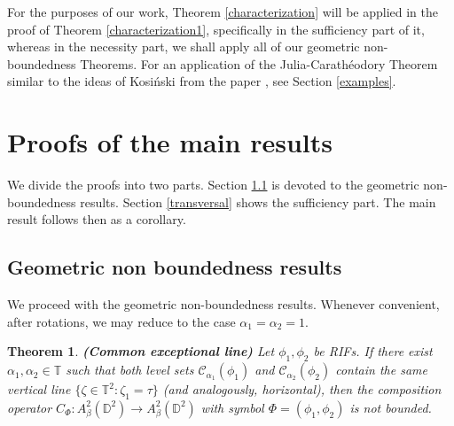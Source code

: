 \documentclass[12pt]{amsart}
\newtheorem{theorem}{Theorem}[section]
\numberwithin{equation}{section}
\begin{document}
For the purposes of our work, Theorem \ref{characterization} will be applied in the proof of Theorem \ref{characterization1}, specifically in the sufficiency part of it, whereas in the necessity part, we shall apply all of our geometric non-boundedness Theorems. For an application of the Julia-Carath\'eodory Theorem similar to the ideas of Kosi\'nski from the paper \cite{CompositionsKosinski}, see Section \ref{examples}.
\section{Proofs of the main results} \label{proofs} We divide the proofs into two parts. Section \ref{geometric} is devoted to the geometric non-boundedness results. Section \ref{transversal} shows the sufficiency part. The main result follows then as a corollary.
\subsection{Geometric non boundedness results}\label{geometric} We proceed with the geometric non-boundedness results.
Whenever convenient, after rotations, we may reduce to the case $\alpha_1=\alpha_2=1.$
\begin{theorem}\textbf{(Common exceptional line)} Let $\phi_1,\phi_2$ be RIFs. If there exist $\alpha_1,\alpha_2\in\mathbb{T}$ such that both level sets $\mathcal{C}_{\alpha_1}(\phi_1)$ and $\mathcal{C}_{\alpha_2}(\phi_2)$ contain the same vertical line $\{\zeta\in \mathbb{T}^2:\zeta_1=\tau\}$ (and analogously, horizontal), then the composition operator $C_{\Phi}:A^2_{\beta}(\mathbb{D}^2)\to A^2_{\beta}(\mathbb{D}^2)$ with symbol $\Phi=(\phi_1,\phi_2)$ is not bounded.
\end{theorem}  
\end{document}
